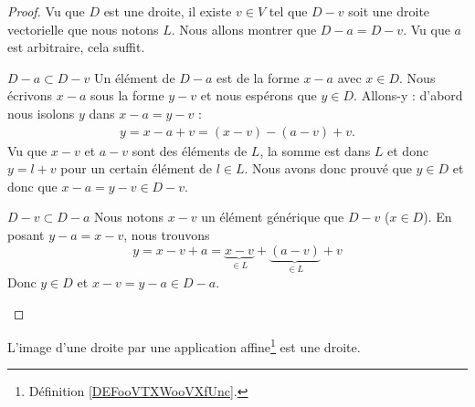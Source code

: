 \begin{proof}
    Vu que \( D\) est une droite, il existe \( v\in V\) tel que \( D-v\) soit une droite vectorielle que nous notons \( L\). Nous allons montrer que \( D-a=D-v\). Vu que \( a\) est arbitraire, cela suffit.

    \begin{subproof}
        \item[\( D-a\subset D-v\)]
            Un élément de \( D-a\) est de la forme \( x-a\) avec \( x\in D\). Nous écrivons \( x-a\) sous la forme \( y-v\) et nous espérons que \( y\in D\). Allons-y : d'abord nous isolons \( y\) dans \( x-a=y-v\) :
            \begin{subequations}
                \begin{align}
                    y=x-a+v=(x-v)-(a-v)+v.
                \end{align}
            \end{subequations}
            Vu que \( x-v\) et \( a-v\) sont des éléments de \( L\), la somme est dans \( L\) et donc \( y=l+v\) pour un certain élément de \( l\in L\). Nous avons donc prouvé que \( y\in D\) et donc que \( x-a=y-v\in D-v\).
        \item[\( D-v\subset D-a\)]
            Nous notons \( x-v\) un élément générique que \( D-v\) (\( x\in D\)). En posant \( y-a=x-v\), nous trouvons
            \begin{equation}
                y=x-v+a=\underbrace{x-v}_{\in L}+\underbrace{(a-v)}_{\in L}+v
            \end{equation}
            Donc \( y\in D\) et \( x-v=y-a\in D-a\).
    \end{subproof}
\end{proof}

\begin{proposition}     \label{PROPooNTHVooWWyafJ}
    L'image d'une droite par une application affine\footnote{Définition \ref{DEFooVTXWooVXfUnc}.} est une droite.
\end{proposition}


